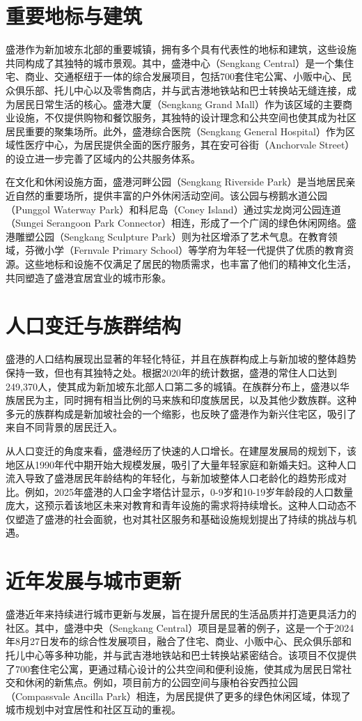 \documentclass[11pt,a4paper,twoside,openany]{book}
\begin{document}
\section{重要地标与建筑}
盛港作为新加坡东北部的重要城镇，拥有多个具有代表性的地标和建筑，这些设施共同构成了其独特的城市景观。其中，盛港中心（Sengkang Central）是一个集住宅、商业、交通枢纽于一体的综合发展项目，包括700套住宅公寓、小贩中心、民众俱乐部、托儿中心以及零售商店，并与武吉港地铁站和巴士转换站无缝连接，成为居民日常生活的核心。盛港大厦（Sengkang Grand Mall）作为该区域的主要商业设施，不仅提供购物和餐饮服务，其独特的设计理念和公共空间也使其成为社区居民重要的聚集场所。此外，盛港综合医院（Sengkang General Hospital）作为区域性医疗中心，为居民提供全面的医疗服务，其在安可谷街（Anchorvale Street）的设立进一步完善了区域内的公共服务体系。

在文化和休闲设施方面，盛港河畔公园（Sengkang Riverside Park）是当地居民亲近自然的重要场所，提供丰富的户外休闲活动空间。该公园与榜鹅水道公园（Punggol Waterway Park）和科尼岛（Coney Island）通过实龙岗河公园连道（Sungei Serangoon Park Connector）相连，形成了一个广阔的绿色休闲网络。盛港雕塑公园（Sengkang Sculpture Park）则为社区增添了艺术气息。在教育领域，芬微小学（Fernvale Primary School）等学府为年轻一代提供了优质的教育资源。这些地标和设施不仅满足了居民的物质需求，也丰富了他们的精神文化生活，共同塑造了盛港宜居宜业的城市形象。

\section{人口变迁与族群结构}
盛港的人口结构展现出显著的年轻化特征，并且在族群构成上与新加坡的整体趋势保持一致，但也有其独特之处。根据2020年的统计数据，盛港的常住人口达到249,370人，使其成为新加坡东北部人口第二多的城镇。在族群分布上，盛港以华族居民为主，同时拥有相当比例的马来族和印度族居民，以及其他少数族群。这种多元的族群构成是新加坡社会的一个缩影，也反映了盛港作为新兴住宅区，吸引了来自不同背景的居民迁入。

从人口变迁的角度来看，盛港经历了快速的人口增长。在建屋发展局的规划下，该地区从1990年代中期开始大规模发展，吸引了大量年轻家庭和新婚夫妇。这种人口流入导致了盛港居民年龄结构的年轻化，与新加坡整体人口老龄化的趋势形成对比。例如，2025年盛港的人口金字塔估计显示，0-9岁和10-19岁年龄段的人口数量庞大，这预示着该地区未来对教育和青年设施的需求将持续增长。这种人口动态不仅塑造了盛港的社会面貌，也对其社区服务和基础设施规划提出了持续的挑战与机遇。

\section{近年发展与城市更新}
盛港近年来持续进行城市更新与发展，旨在提升居民的生活品质并打造更具活力的社区。其中，盛港中央（Sengkang Central）项目是显著的例子，这是一个于2024年8月27日发布的综合性发展项目，融合了住宅、商业、小贩中心、民众俱乐部和托儿中心等多种功能，并与武吉港地铁站和巴士转换站紧密结合。该项目不仅提供了700套住宅公寓，更通过精心设计的公共空间和便利设施，使其成为居民日常社交和休闲的新焦点。例如，项目前方的公园空间与康柏谷安西拉公园（Compassvale Ancilla Park）相连，为居民提供了更多的绿色休闲区域，体现了城市规划中对宜居性和社区互动的重视。
\end{document}
